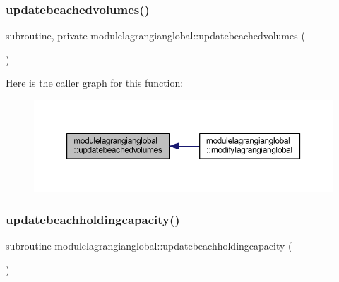 \subsubsection{\texorpdfstring{updatebeachedvolumes()}{updatebeachedvolumes()}}
{\footnotesize\ttfamily subroutine, private modulelagrangianglobal\+::updatebeachedvolumes (\begin{DoxyParamCaption}{ }\end{DoxyParamCaption})\hspace{0.3cm}{\ttfamily [private]}}

Here is the caller graph for this function\+:\nopagebreak
\begin{figure}[H]
\begin{center}
\leavevmode
\includegraphics[width=350pt]{namespacemodulelagrangianglobal_a64f9a95bbf347c4a3b9599b01ab16129_icgraph}
\end{center}
\end{figure}
\mbox{\label{namespacemodulelagrangianglobal_a339c78433f179a296304ed03a3fcfae9}} 
\subsubsection{\texorpdfstring{updatebeachholdingcapacity()}{updatebeachholdingcapacity()}}
{\footnotesize\ttfamily subroutine modulelagrangianglobal\+::updatebeachholdingcapacity (\begin{DoxyParamCaption}{ }\end{DoxyParamCaption})\hspace{0.3cm}{\ttfamily [private]}}

